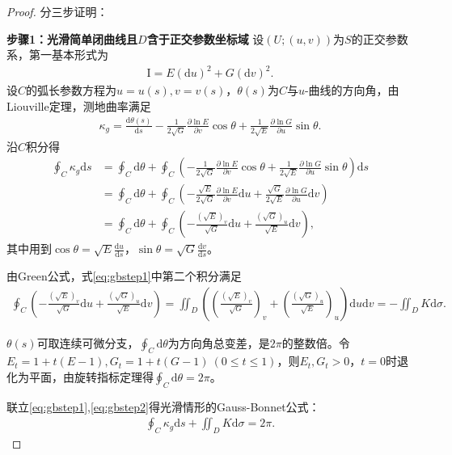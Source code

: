 \documentclass[../../main.tex]{subfiles}%
\begin{document}
\begin{proof}
分三步证明：

\textbf{步骤1：光滑简单闭曲线且$D$含于正交参数坐标域}
设$(U;(u,v))$为$S$的正交参数系，第一基本形式为
\begin{align*}
\mathrm{I}=E(\mathrm{d}u)^2+G(\mathrm{d}v)^2.
\end{align*}
设$C$的弧长参数方程为$u=u(s),v=v(s)$，$\theta(s)$为$C$与$u$-曲线的方向角，由Liouville定理，测地曲率满足
\begin{align*}
\kappa_g=\frac{\mathrm{d}\theta(s)}{\mathrm{d}s}-\frac{1}{2\sqrt{G}}\frac{\partial\ln E}{\partial v}\cos\theta+\frac{1}{2\sqrt{E}}\frac{\partial\ln G}{\partial u}\sin\theta.
\end{align*}
沿$C$积分得
\begin{align}
\oint_{C}\kappa_g\mathrm{d}s&=\oint_{C}\mathrm{d}\theta+\oint_{C}\left(-\frac{1}{2\sqrt{G}}\frac{\partial\ln E}{\partial v}\cos\theta+\frac{1}{2\sqrt{E}}\frac{\partial\ln G}{\partial u}\sin\theta\right)\mathrm{d}s\nonumber\\
&=\oint_{C}\mathrm{d}\theta+\oint_{C}\left(-\frac{\sqrt{E}}{2\sqrt{G}}\frac{\partial\ln E}{\partial v}\mathrm{d}u+\frac{\sqrt{G}}{2\sqrt{E}}\frac{\partial\ln G}{\partial u}\mathrm{d}v\right)\nonumber\\
&=\oint_{C}\mathrm{d}\theta+\oint_{C}\left(-\frac{(\sqrt{E})_v}{\sqrt{G}}\mathrm{d}u+\frac{(\sqrt{G})_u}{\sqrt{E}}\mathrm{d}v\right),\label{eq:gbstep1}
\end{align}
其中用到$\cos\theta=\sqrt{E}\frac{\mathrm{d}u}{\mathrm{d}s}$，$\sin\theta=\sqrt{G}\frac{\mathrm{d}v}{\mathrm{d}s}$。

由Green公式，式\eqref{eq:gbstep1}中第二个积分满足
\begin{align}
\oint_{C}\left(-\frac{(\sqrt{E})_v}{\sqrt{G}}\mathrm{d}u+\frac{(\sqrt{G})_u}{\sqrt{E}}\mathrm{d}v\right)=\iint_{D}\left(\left(\frac{(\sqrt{E})_v}{\sqrt{G}}\right)_v+\left(\frac{(\sqrt{G})_u}{\sqrt{E}}\right)_u\right)\mathrm{d}u\mathrm{d}v=-\iint_{D}K\mathrm{d}\sigma.\label{eq:gbstep2}
\end{align}

$\theta(s)$可取连续可微分支，$\oint_{C}\mathrm{d}\theta$为方向角总变差，是$2\pi$的整数倍。令$E_t=1+t(E-1),G_t=1+t(G-1)\ (0\leqslant t\leqslant1)$，则$E_t,G_t>0$，$t=0$时退化为平面，由旋转指标定理得$\oint_{C}\mathrm{d}\theta=2\pi$。

联立\eqref{eq:gbstep1},\eqref{eq:gbstep2}得光滑情形的Gauss-Bonnet公式：
\begin{align*}
\oint_{C}\kappa_g\mathrm{d}s+\iint_{D}K\mathrm{d}\sigma=2\pi.
\end{align*}


\end{proof}
\end{document}
